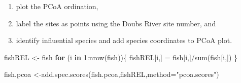 \documentclass[
]{article}
\newenvironment{Shaded}{\begin{snugshade}}{\end{snugshade}}
\newcommand{\AttributeTok}[1]{\textcolor[rgb]{0.77,0.63,0.00}{#1}}
\newcommand{\ConstantTok}[1]{\textcolor[rgb]{0.00,0.00,0.00}{#1}}
\newcommand{\ControlFlowTok}[1]{\textcolor[rgb]{0.13,0.29,0.53}{\textbf{#1}}}
\newcommand{\DecValTok}[1]{\textcolor[rgb]{0.00,0.00,0.81}{#1}}
\newcommand{\FunctionTok}[1]{\textcolor[rgb]{0.00,0.00,0.00}{#1}}
\newcommand{\NormalTok}[1]{#1}
\newcommand{\OtherTok}[1]{\textcolor[rgb]{0.56,0.35,0.01}{#1}}
\newcommand{\SpecialCharTok}[1]{\textcolor[rgb]{0.00,0.00,0.00}{#1}}
\newcommand{\StringTok}[1]{\textcolor[rgb]{0.31,0.60,0.02}{#1}}
\providecommand{\tightlist}{%
  \setlength{\itemsep}{0pt}\setlength{\parskip}{0pt}}
\begin{document}
\begin{Shaded}
\end{Shaded}

\begin{enumerate}
\def\labelenumi{\arabic{enumi}.}
\setcounter{enumi}{2}
\tightlist
\item
  plot the PCoA ordination,
\item
  label the sites as points using the Doubs River site number, and
\item
  identify influential species and add species coordinates to PCoA plot.
\end{enumerate}

\begin{Shaded}
\begin{Highlighting}[]
\NormalTok{fishREL }\OtherTok{\textless{}{-}}\NormalTok{ fish}
\ControlFlowTok{for}\NormalTok{ (i }\ControlFlowTok{in} \DecValTok{1}\SpecialCharTok{:}\FunctionTok{nrow}\NormalTok{(fish))\{}
\NormalTok{  fishREL[i,] }\OtherTok{=}\NormalTok{ fish[i,]}\SpecialCharTok{/}\FunctionTok{sum}\NormalTok{(fish[i,])}
\NormalTok{\}}

\NormalTok{fish.pcoa }\OtherTok{\textless{}{-}}\FunctionTok{add.spec.scores}\NormalTok{(fish.pcoa,fishREL,}\AttributeTok{method=}\StringTok{"pcoa.scores"}\NormalTok{)}
\end{Highlighting}
\end{Shaded}
\end{document}

